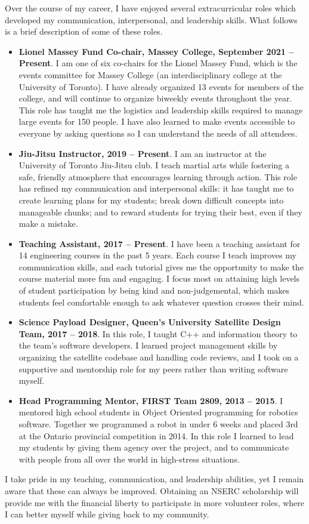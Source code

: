 \documentclass[a4paper,12pt]{article}
\begin{document}
Over the course of my career, I have enjoyed several extracurricular roles which
developed my communication, interpersonal, and leadership skills.
What follows is a brief description of some of these roles.
\begin{itemize}
\item \textbf{Lionel Massey Fund Co-chair, Massey College, September 2021 -- Present}.
    I am one of six co-chairs for the Lionel Massey Fund, which is the events
    committee for Massey College (an interdisciplinary college at the University
    of Toronto).
    I have already organized 13 events for members of the college, and will
    continue to organize biweekly events throughout the year.
    This role has taught me the logistics and leadership skills required to
    manage large events for 150 people.
    I have also learned to make events accessible to everyone by asking
    questions so I can understand the needs of all attendees.

\item \textbf{Jiu-Jitsu Instructor, 2019 -- Present}. 
    I am an instructor at the University of Toronto Jiu-Jitsu club. I teach
    martial arts while fostering a safe, friendly atmosphere that
    encourages learning through action.
    This role has refined my communication and interpersonal skills:
    it has taught me to create learning plans for my students;
    break down difficult concepts into manageable chunks; 
    and to reward students for trying their best, even if they make a mistake.

\item \textbf{Teaching Assistant, 2017 -- Present}.
    I have been a teaching assistant for 14 engineering courses in the past 5 years.
    Each course I teach improves my communication skills, and each tutorial gives
    me the opportunity to make the course material more fun and engaging.
    I focus most on attaining high levels of student participation by being
    kind and non-judgemental, which makes students feel
    comfortable enough to ask whatever question crosses their mind. 

\item \textbf{Science Payload Designer, Queen’s University Satellite Design
    Team, 2017 -- 2018}. 
    In this role, I taught C++ and information theory to the team’s software
    developers. I learned project management skills by organizing
    the satellite codebase and handling code reviews, and I took on a supportive
    and mentorship role for my peers rather than writing software myself.

\item \textbf{Head Programming Mentor, FIRST Team 2809, 2013 -- 2015}. 
    I mentored high school students in Object Oriented programming for robotics
    software. Together we programmed a robot in under 6 weeks and placed 3rd at
    the Ontario provincial competition in 2014.
    In this role I learned to lead my students by giving them agency over the
    project, and to communicate with people from all over the world in
    high-stress situations.

\end{itemize}

I take pride in my teaching, communication, and leadership abilities, yet I
remain aware that these can always be improved.
Obtaining an NSERC scholarship will provide me with the financial liberty to
participate in more volunteer roles, where I can better myself while giving back to my
community.
\end{document}
